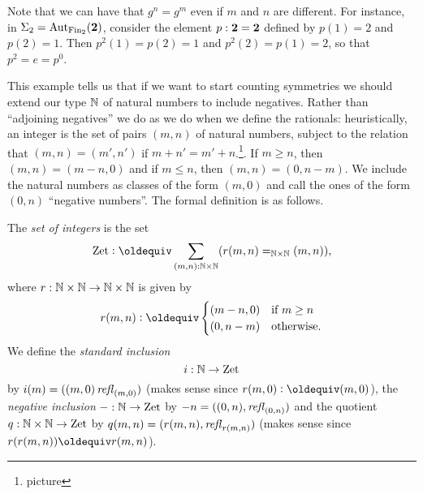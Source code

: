 \begin{definition}
\begin{example}
Note that we can have that $g^n=g^m$ even if $m$ and $n$ are different.  For instance, in $\Sigma_2=\mathrm{Aut}_{\mathrm{Fin}_2}(\mathbf{2} )$, consider the element $p:\mathbf{2} =\mathbf{2} $ defined by $p(1)=2$ and $p(2)=1$.  Then $p^2(1)=p(2)=1$ and $p^2(2)=p(1)=2$, so that $p^2=e=p^0$.
   \end{example}
This example tells us that if we want to start counting symmetries we should extend our type $\mathbb{N}$ of natural numbers to include negatives.  Rather than ``adjoining negatives'' we do as we do when we define the rationals: heuristically, an integer is the set of pairs $(m,n)$ of natural numbers, subject to the relation that $(m,n)=(m',n')$ if $m+n'=m'+n$.\footnote{picture}.  If $m\geq n$, then $(m,n)=(m-n,0)$ and if $m\leq n$, then $(m,n)=(0,n-m)$.  We include the natural numbers as classes of the form $(m,0)$ and call the ones of the form $(0,n)$ ``negative numbers''.  The formal definition is as follows.
\begin{definition}
  The \emph{set of integers} is the set
$$\zet\defequi \sum_{(m,n):\NN\times\NN}(r(m,n)=_{\NN\times\NN}(m,n)),$$
where $r:\mathbb{N}\times\mathbb{N}\to\mathbb{N}\times\mathbb{N}$ is given by
$$r(m,n)\defequi
\begin{cases}
  (m-n,0)&\text{if $m\geq n$}\\
  (0,n-m)&\text{otherwise.}
\end{cases}
$$
We define the \emph{standard inclusion} 
$$i:\mathbb{N}\to\mathrm{Zet}$$ by $i(m)=((m,0)\mathop{{\it refl}_{(m,0)}})$ (makes sense since $r(m,0)\defequi(m,0)$), the \emph{negative inclusion} $-:\mathbb{N}\to\mathrm{Zet}$ by $-n=((0,n),\mathop{{\it refl}_{(0,n)}})$ and the quotient $q:\mathbb{N}\times\mathbb{N}\to\mathrm{Zet}$ by $q(m,n)=(r(m,n),\mathop{{\it refl}_{r(m,n)}})$ (makes sense since $r(r(m,n))\oldequiv r(m,n)$).
\end{definition}




\end{definition}
